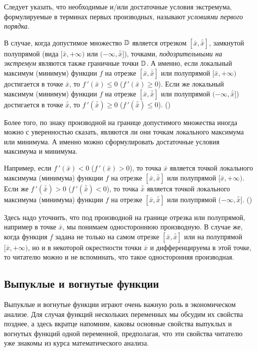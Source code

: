     Следует указать, что необходимые и/или достаточные условия
    экстремума, формулируемые в терминах первых производных,
    называют \emph{условиями первого порядка}.

    В случае, когда допустимое множество $\mathbb{D}$ является отрезком
    $[\bar{x},\bar{\bar{x}}]$, замкнутой полупрямой (вида $[\bar{x},+\infty)$ или
    $(-\infty,\bar{\bar{x}}]$), точками, \emph{подозрительными на экстремум} являются
    также граничные точки $\mathbb{D}$. А именно, если локальный
    максимум (минимум)
    функции $f$ на отрезке $[\bar{x},\bar{\bar{x}}]$ или
    полупрямой $[\bar{x},+\infty)$ достигается
    в точке $\bar{x}$, то $f\,'(\bar{x})\leqslant0$
    ($f\,'(\bar{x})\geqslant0$). Если же локальный
    максимум (минимум)
    функции $f$ на отрезке $[\bar{x},\bar{\bar{x}}]$ или
    полупрямой $(-\infty,\bar{\bar{x}}]$)
    достигается в точке $\bar{\bar{x}}$, то
    $f\,'(\bar{\bar{x}})\geqslant0$ ($f\,'(\bar{\bar{x}})\leqslant0$).
    ()

    Более того, по  знаку производной на границе допустимого
    множества иногда можно с уверенностью сказать, являются ли они
    точкам локального максимума или минимума. А именно можно
    сформулировать достаточные условия максимума и минимума.


    Например, если $f\,'(\bar{x})<0$ ($f\,'(\bar{x})>0$), то
    точка $\bar{x}$ является точкой локального максимума (минимума) функции $f$ на
    отрезке $[\bar{x},\bar{\bar{x}}]$ или полупрямой $[\bar{x},+\infty)$.
    Если же $f\,'(\bar{\bar{x}})>0$ ($f\,'(\bar{\bar{x}})<0$), то
    точка $\bar{\bar{x}}$ является точкой локального максимума (минимума) функции $f$ на
    отрезке $[\bar{x},\bar{\bar{x}}]$ или полупрямой $(-\infty,\bar{\bar{x}}]$.
    ()

    Здесь надо уточнить, что под производной на границе
    отрезка или полупрямой, например в точке $\bar{x}$,
    мы понимаем одностороннюю производную.
    В случае же, когда функция $f$ задана не только на самом отрезке
    $[\bar{x},\bar{\bar{x}}]$ или на полупрямой $[\bar{x},+\infty)$,
    но и в некоторой окрестности точки $\bar{x}$ и
    дифференцируема в этой точке, то читателю можно и не вспоминать, что такое
    односторонняя производная.


\subsection{Выпуклые и вогнутые функции}

    Выпуклые и вогнутые функции играют очень важную роль в
    экономическом анализе. Для случая функций нескольких переменных мы обсудим
    их свойства позднее, а здесь вкратце напомним, каковы основные свойства
    выпуклых и вогнутых функций одной переменной, предполагая, что
    эти свойства читателю уже знакомы из курса математического
    анализа.

